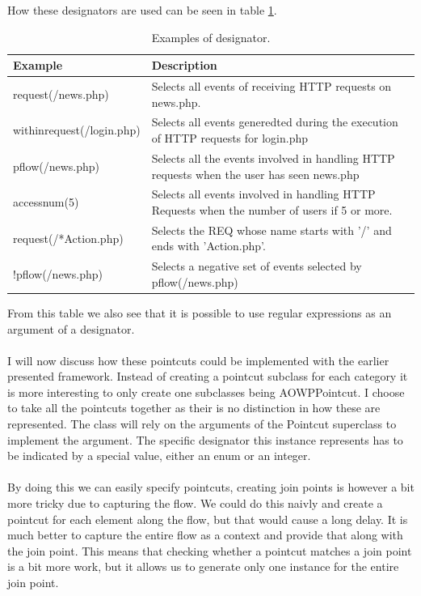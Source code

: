 \documentclass[a4paper]{report}
\begin{document}
How these designators are used can be seen in table \ref{tab:Designators_AOWP_Pointcut}.
\begin{table}
\centering
\begin{tabular}{l|p{7cm}}
\hline
Example & Description\\
\hline
\hline
request(/news.php) & Selects all events of receiving HTTP requests on news.php.\\
\hline
withinrequest(/login.php) & Selects all events generedted during the execution of HTTP requests for login.php\\
\hline
pflow(/news.php) & Selects all the events involved in handling HTTP requests when the user has seen news.php\\
\hline
accessnum(5) & Selects all events involved in handling HTTP Requests when the number of users if 5 or more.\\
\hline
request(/*Action.php) & Selects the REQ whose name starts with '/' and ends with 'Action.php'.\\
\hline
!pflow(/news.php) & Selects a negative set of events selected by pflow(/news.php)\\
\hline
\end{tabular}
\caption{Examples of designator.}
\label{tab:Designators_AOWP_Pointcut}
\end{table}
From this table we also see that it is possible to use regular expressions as an argument of a designator.\\
\\
I will now discuss how these pointcuts could be implemented with the earlier presented framework. Instead of creating a pointcut subclass for each category it is more interesting to only create one subclasses being AOWPPointcut. I choose to take all the pointcuts together as their is no distinction in how these are represented. The class will rely on the arguments of the Pointcut superclass to implement the argument. The specific designator this instance represents has to be indicated by a special value, either an enum or an integer.\\
\\
By doing this we can easily specify pointcuts, creating join points is however a bit more tricky due to capturing the flow. We could do this naivly and create a pointcut for each element along the flow, but that would cause a long delay. It is much better to capture the entire flow as a context and provide that along with the join point. This means that checking whether a pointcut matches a join point is a bit more work, but it allows us to generate only one instance for the entire join point.\\
\end{document}
